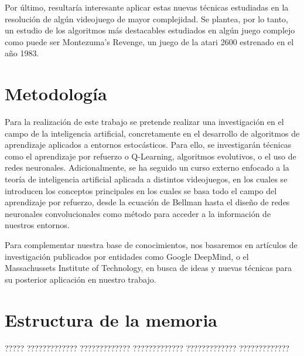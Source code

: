 \documentclass[11pt,spanish,listoffigures,listoftables]{tfgetsinf}
\begin{document}
Por último, resultaría interesante aplicar estas nuevas técnicas estudiadas en la resolución de algún videojuego de mayor complejidad. Se plantea, por lo tanto, un estudio de los algoritmos más destacables estudiados en algún juego complejo como puede ser Montezuma's Revenge, un juego de la atari 2600 estrenado en el año 1983.


\section{Metodología}

Para la realización de este trabajo se pretende realizar una investigación en el campo de la inteligencia artificial, concretamente en el desarrollo de algoritmos de aprendizaje aplicados a entornos estocásticos. Para ello, se investigarán técnicas como el aprendizaje por refuerzo o Q-Learning, algoritmos evolutivos, o el uso de redes neuronales. Adicionalmente, se ha seguido un curso externo enfocado a la teoría de inteligencia artificial aplicada a distintos videojuegos, en los cuales se introducen los conceptos principales en los cuales se basa todo el campo del aprendizaje por refuerzo, desde la ecuación de Bellman hasta el diseño de redes neuronales convolucionales como método para acceder a la información de nuestros entornos. \par

Para complementar nuestra base de conocimientos, nos basaremos en artículos de investigación publicados por entidades como Google DeepMind, o el Massachussets Institute of Technology, en busca de ideas y nuevas técnicas para su posterior aplicación en nuestro trabajo.


\section{Estructura de la memoria}

????? ????????????? ????????????? ????????????? ????????????? ????????????? 



\end{document}

